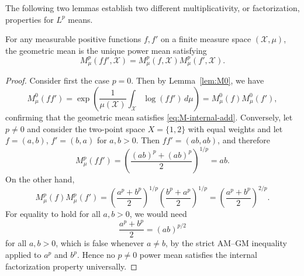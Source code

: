 \documentclass[reqno]{amsart}
\begin{document}
The following two lemmas establish two different multiplicativity, or factorization, properties for $L^p$ means.
\begin{lem}
\label{lem:mean-factorization}
For any measurable positive functions $f,f'$ on a finite measure space $(\mathcal{X},\mu)$, the geometric mean is the unique power mean satisfying 
\begin{equation}
\label{eq:M-internal-add}
M^p_\mu(ff',\mathcal{X})=M^p_\mu(f,\mathcal{X})M^p_\mu(f',\mathcal{X}).
\end{equation}
\end{lem}
\begin{proof}
Consider first the case $p=0$. Then by Lemma~\ref{lem:M0}, we have 
$$
M^0_\mu(ff')
=
\exp\left(\frac{1}{\mu(\mathcal{X})}\int_{\mathcal{X}}\log(ff')\,d\mu\right)
=
M^0_\mu(f)M^0_\mu(f'),
$$
confirming that the geometric mean satisfies \eqref{eq:M-internal-add}.
Conversely, let $p\neq0$ and consider the two-point space $X=\{1,2\}$ with equal weights
and let $f=(a,b)$, $f'=(b,a)$ for $a,b>0$. Then $ff'=(ab,ab)$, and therefore
$$
M^p_\mu(ff')=
\left(\frac{(ab)^p+(ab)^p}{2}\right)^{1/p}=ab.
$$
On the other hand,
$$
M^p_\mu(f)M^p_\mu(f')
=
\left(\frac{a^p+b^p}{2}\right)^{1/p}
\left(\frac{b^p+a^p}{2}\right)^{1/p}
=
\left(\frac{a^p+b^p}{2}\right)^{2/p}.
$$
For equality to hold for all $a,b>0$, we would need
$$
\frac{a^p+b^p}{2}=(ab)^{p/2}
$$
for all $a,b>0$, which is false whenever $a \neq b$, by the strict
AM--GM inequality applied to $a^p$ and $b^p$. Hence no $p \neq 0$
power mean satisfies the internal factorization property universally.
\end{proof}
\end{document}
